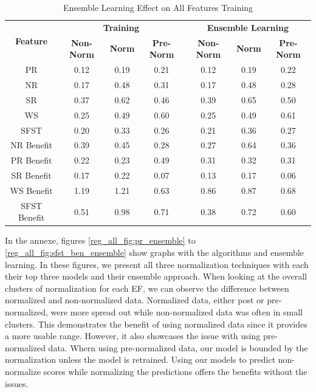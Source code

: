 \documentclass[12pt,letterpaper]{article}
\begin{document}
\begin{table}[H]
\centering
\begin{tabular}{|c||c|c|c||c|c|c|}
\hline
\multirow{2}{*}{\textbf{Feature}} & \multicolumn{3}{c||}{\textbf{Training}} & \multicolumn{3}{c|}{\textbf{Ensemble Learning}} \\
\cline{2-7}
 & \textbf{Non-Norm} & \textbf{Norm} & \textbf{Pre-Norm} & \textbf{Non-Norm} & \textbf{Norm} & \textbf{Pre-Norm} \\
\hline
PR & 0.12 & 0.19 & 0.21 & 0.12 & 0.19 & 0.22 \\
\hline
NR & 0.17 & 0.48 & 0.31 & 0.17 & 0.48 & 0.28 \\
\hline
SR & 0.37 & 0.62 & 0.46 & 0.39 & 0.65 & 0.50\\
\hline
WS & 0.25 & 0.49 & 0.60 & 0.25 & 0.49 & 0.61 \\
\hline
SFST & 0.20 & 0.33 & 0.26 & 0.21 & 0.36 & 0.27\\
\hline
NR Benefit & 0.39 & 0.45 & 0.28 & 0.27 & 0.64 & 0.36 \\
\hline
PR Benefit & 0.22 & 0.23 & 0.49 & 0.31 & 0.32 & 0.31 \\
\hline
SR Benefit & 0.17 & 0.22 & 0.07 & 0.13 & 0.17 & 0.06 \\
\hline
WS Benefit & 1.19 & 1.21 & 0.63 & 0.86 & 0.87 & 0.68 \\
\hline
SFST Benefit & 0.51 & 0.98 & 0.71 & 0.38 & 0.72 & 0.60 \\
\hline
\end{tabular}
\caption{Ensemble Learning Effect on All Features Training}
\label{reg_all_tab:ensemble}
\end{table}

In the annexe, figures \ref{reg_all_fig:pr_ensemble} to \ref{reg_all_fig:sfst_ben_ensemble} show graphs with the algorithms and ensemble learning.
In these figures, we present all three normalization techniques with each their top three models and their ensemble approach.
When looking at the overall clusters of normalization for each \ac{EF}, we can observe the difference between normalized and non-normalized data.
Normalized data, either post or pre-normalized, were more spread out while non-normalized data was often in small clusters.
This demonstrates the benefit of using normalized data since it provides a more usable range.
However, it also showcases the issue with using pre-normalized data.
Whern using pre-normalized data, our model is bounded by the normalization unless the model is retrained.
Using our models to predict non-normalize scores while normalizing the predictions offers the benefits without the issues.
\end{document}
